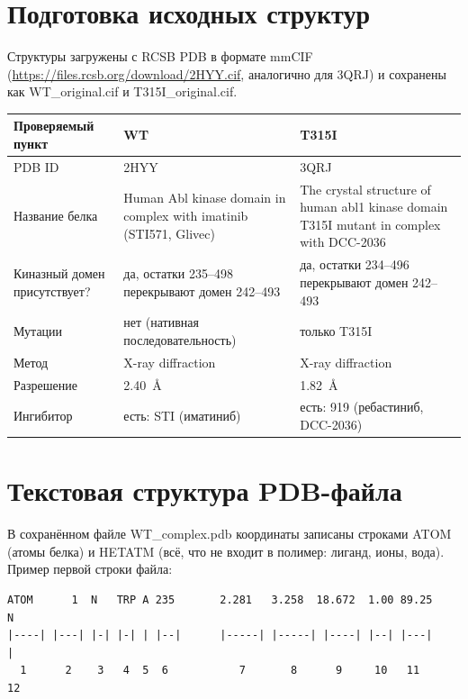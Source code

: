 \documentclass[12pt,a4paper]{article}
\newcommand{\code}[1]{{\ttfamily #1}}
\begin{document}
\section{Подготовка исходных структур}

Структуры загружены с RCSB PDB в формате mmCIF
(\url{https://files.rcsb.org/download/2HYY.cif}, аналогично для 3QRJ) и сохранены как
\code{WT\_original.cif} и \code{T315I\_original.cif}.

\begin{center}
\begin{tabular}{L{4.4cm}L{5.1cm}L{5.1cm}}
\toprule
\textbf{Проверяемый пункт} & \textbf{WT} & \textbf{T315I} \\
\midrule
PDB ID & 2HYY & 3QRJ \\
Название белка & Human Abl kinase domain in complex with imatinib (STI571, Glivec) &
The crystal structure of human abl1 kinase domain T315I mutant in complex with DCC-2036 \\
Киназный домен присутствует? & да, остатки 235--498 перекрывают домен 242--493 &
да, остатки 234--496 перекрывают домен 242--493 \\
Мутации & нет (нативная последовательность) & только T315I \\
Метод & X-ray diffraction & X-ray diffraction \\
Разрешение & 2.40~\AA & 1.82~\AA \\
Ингибитор & есть: STI (иматиниб) & есть: 919 (ребастиниб, DCC-2036) \\
\bottomrule
\end{tabular}
\end{center}

\section{Текстовая структура PDB-файла}

В сохранённом файле \code{WT\_complex.pdb} координаты записаны строками \code{ATOM}
(атомы белка) и \code{HETATM} (всё, что не входит в полимер: лиганд, ионы, вода).
Пример первой строки файла:

\begin{verbatim}
ATOM      1  N   TRP A 235       2.281   3.258  18.672  1.00 89.25           N
|----| |---| |-| |-| | |--|      |-----| |-----| |----| |--| |---|           |
  1      2    3   4  5  6           7       8      9     10   11            12
\end{verbatim}
\end{document}
